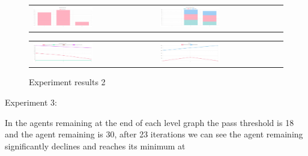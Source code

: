 \begin{figure}[htbp]
\begin{tabular}{ll}
    \centering
    \includegraphics[width=0.5\textwidth]{007_team_4_agent_design/figures/EX2_3.jpg}
    &
    \includegraphics[width=0.5\textwidth]{007_team_4_agent_design/figures/EX2_4.jpg}
\end{tabular}

\end{figure}


\begin{figure}[htbp]
\begin{tabular}{ll}
    \centering
    \includegraphics[width=0.5\textwidth]{007_team_4_agent_design/figures/EX2_5.jpg}
    &
    \includegraphics[width=0.5\textwidth]{007_team_4_agent_design/figures/EX2_6.jpg}
\end{tabular}
    \caption{Experiment results 2}
\end{figure}


\newpage

Experiment 3:

\par In the agents remaining at the end of each level graph the pass threshold is 18 and the agent remaining is 30, after 23 iterations we can see the agent remaining significantly declines and reaches its minimum at 

